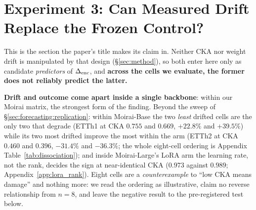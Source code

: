 \section{Experiment 3: Can Measured Drift Replace the Frozen Control?}
\label{sec:exp3}

This is the section the paper's title makes its claim in.  Neither CKA nor weight drift is manipulated by that design
(\S\ref{sec:method}), so both enter here only as candidate \emph{predictors} of
$\Delta_\text{enc}$, and \textbf{across the cells we evaluate, the former does not reliably
predict the latter.}

\label{sec:forecasting:nonmoirai}
\textbf{Drift and outcome come apart inside a single backbone}: within our
Moirai matrix, the strongest form of the finding.  Beyond the sweep of
\S\ref{sec:forecasting:replication}: within Moirai-Base the two \emph{least}
drifted cells are the only two that degrade (ETTh1 at CKA $0.755$ and $0.669$,
$+22.8\%$ and $+39.5\%$) while its two most drifted improve the most within the
arm (ETTh2 at CKA $0.460$ and $0.396$, $-31.4\%$ and $-36.3\%$; the whole
eight-cell ordering is Appendix Table~\ref{tab:dissociation}); and inside
Moirai-Large's LoRA arm the learning rate, not the rank, decides the sign at
near-identical CKA ($0.973$ against $0.989$; Appendix~\ref{app:lora_rank}).
Eight cells are a \emph{counterexample} to ``low CKA means damage'' and nothing
more: we read the ordering as illustrative, claim no reverse relationship from
$n{=}8$, and leave the negative result to the pre-registered test below.

